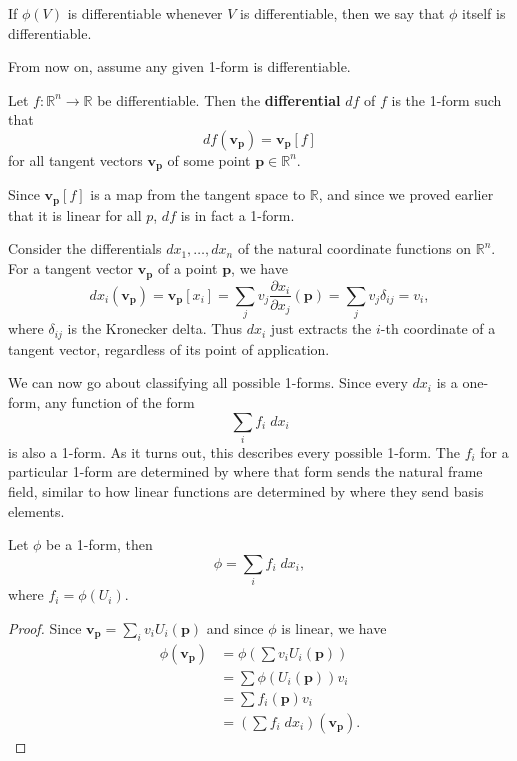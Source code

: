 \documentclass[10pt]{report}
\begin{document}
If $\phi(V)$ is differentiable whenever $V$ is differentiable, then we say that $\phi$ itself is differentiable.

\begin{note}
From now on, assume any given 1-form is differentiable.
\end{note}

\begin{defn}
Let $f:\mathbb{R}^n\to \mathbb{R}$ be differentiable. Then the \textbf{differential} $df$ of $f$ is the 1-form such that
\[
	df(\mathbf{v}_{\mathbf{p}}) = \mathbf{v}_{\mathbf{p}}[f]
\] for all tangent vectors $\mathbf{v}_{\mathbf{p}}$ of some point $\mathbf{p} \in \mathbb{R}^n$.
\end{defn}

Since $\mathbf{v}_{\mathbf{p}}[f]$ is a map from the tangent space to $\mathbb{R}$, and since we proved earlier that it is linear for all $p$, $df$ is in fact a 1-form.

\begin{ex}
Consider the differentials $dx_1, \dots, dx_n$ of the natural coordinate functions on $\mathbb{R}^n$. For a tangent vector $\mathbf{v}_{\mathbf{p}}$ of a point $\mathbf{p}$, we have
\[
	dx_i(\mathbf{v}_{\mathbf{p}}) = \mathbf{v}_{\mathbf{p}}[x_i] = \sum_j v_j \frac{\partial x_i}{\partial x_j} (\mathbf{p}) = \sum_j v_j \delta_{ij} = v_i,
\] where $\delta_{ij}$ is the Kronecker delta. Thus $dx_i$ just extracts the $i$-th coordinate of a tangent vector, regardless of its point of application.
\end{ex}

We can now go about classifying all possible 1-forms. Since every $dx_i$ is a one-form, any function of the form
\[
\sum_i f_i \;dx_i
\] is also a 1-form. As it turns out, this describes every possible 1-form. The $f_i$ for a particular 1-form are determined by where that form sends the natural frame field, similar to how linear functions are determined by where they send basis elements.

\begin{prop}
Let $\phi$ be a 1-form, then
\[
	\phi = \sum_i f_i \;dx_i,
\] where $f_i = \phi(U_i)$.
\end{prop}
\begin{proof}
	Since $\mathbf{v}_{\mathbf{p}} = \sum_i v_i U_i(\mathbf{p})$ and since $\phi$ is linear, we have
	\begin{align*}
		\phi(\mathbf{v}_{\mathbf{p}}) &= \phi\left( \sum v_i U_i(\mathbf{p}) \right) \\
					      &= \sum \phi(U_i(\mathbf{p}))v_i \\
					      &= \sum f_i(\mathbf{p}) v_i \\
					      &= \left( \sum f_i \;dx_i \right)(\mathbf{v}_{\mathbf{p}}).
	\end{align*}
\end{proof}
\end{document}
